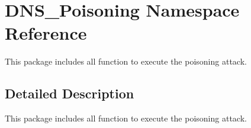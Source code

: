 \hypertarget{namespaceDNS__Poisoning}{}\section{D\+N\+S\+\_\+\+Poisoning Namespace Reference}
\label{namespaceDNS__Poisoning}


This package includes all function to execute the poisoning attack.  




\subsection{Detailed Description}
This package includes all function to execute the poisoning attack. 